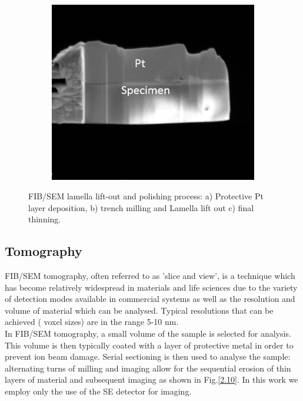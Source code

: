 \begin{figure}
\begin{subfigure}[b]{0.3\textwidth}
	\end{subfigure}%
	\hspace*{0.5cm}
	\begin{subfigure}[b]{0.3\textwidth}
		\centering
		\includegraphics[width=.95\linewidth]{Figs/Ch2/FIB3}
		\caption{}
	\end{subfigure}%
	
	\caption{FIB/SEM lamella lift-out and polishing process: a) Protective Pt layer deposition, b) trench milling and Lamella lift out c) final thinning.}
	\label{2.9}
\end{figure}

\FloatBarrier

\subsection{Tomography}
\label{FIBtomo}
FIB/SEM tomography, often referred to as 'slice and view', is a technique which has become relatively widespread in materials and life sciences due to the variety of detection modes available in commercial systems as well as the resolution and volume of material which can be analysed. Typical resolutions that can be achieved ( voxel sizes) are in the range 5-10 nm.\\
In FIB/SEM tomography, a small volume of the sample is selected for analysis. This volume is then typically coated with a layer of protective metal in order to prevent ion beam damage. Serial sectioning is then used to analyse the sample: alternating turns of milling and imaging allow for the sequential erosion of thin layers of material and subsequent imaging as shown in Fig.\ref{2.10}. In this work we employ only the use of the SE detector for imaging.

